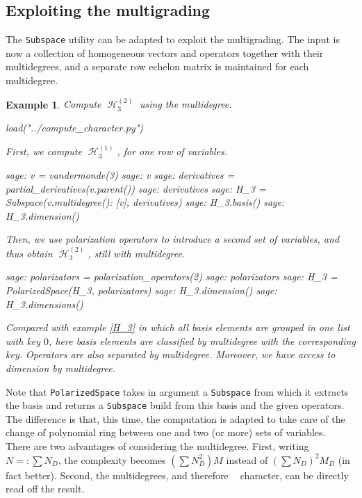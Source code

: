 \documentclass[letter,12pt]{article}
\DeclareMathOperator{\GLr}{GL_r}
\DeclareMathOperator{\harmonics}{\mathcal{H}}
\newtheorem{example}{Example}
\begin{document}
	\subsection{Exploiting the multigrading}
	
	The \texttt{Subspace} utility can be adapted to exploit the multigrading. The input is now a collection of homogeneous vectors and operators together with their multidegrees, and a separate row echelon matrix is maintained for each multidegree.
	
	\begin{example} Compute $\harmonics_{3}^{(2)}$ using the multidegree. 
		\begin{sagesilent}
			load("../compute_character.py")
		\end{sagesilent}
		First, we compute $\harmonics_{3}^{(1)}$, for one row of variables. 
		\begin{sagecommandline}
			sage: v = vandermonde(3)
			sage: v
			sage: derivatives = partial_derivatives(v.parent())
			sage: derivatives
			sage: H_3 = Subspace({v.multidegree(): [v]}, derivatives)
			sage: H_3.basis()
			sage: H_3.dimension()
		\end{sagecommandline}
		Then, we use polarization operators to introduce a second set of variables, and thus obtain $\harmonics_3^{(2)}$, still with multidegree. 
		\begin{sagecommandline}
			sage: polarizators = polarization_operators(2)
			sage: polarizators
			sage: H_3 = PolarizedSpace(H_3, polarizators)
			sage: H_3.dimension()
			sage: H_3.dimensions()
		\end{sagecommandline}
		Compared with example \ref{H_3} in which all basis elements are grouped in one list with key $0$, here basis elements are classified by multidegree with the corresponding key. Operators are also separated by multidegree. Moreover, we have access to dimension by multidegree. 
	\end{example}
	
	Note that \texttt{PolarizedSpace} takes in argument a \texttt{Subspace} from which it extracts the basis and returns a \texttt{Subspace} build from this basis and the given operators. The difference is that, this time, the computation is adapted to take care of the change of polynomial ring between one and two (or more) sets of variables. \\
	
	There are two advantages of considering the multidegree. 
	First, writing $N=:\sum N_D$, the complexity becomes $(\sum N_D^2) M$ instead of $(\sum N_D)^2M_D$ (in fact better).
	Second, the multidegrees, and therefore $\GLr$ character, can be directly read off the result.
	
\end{document}
